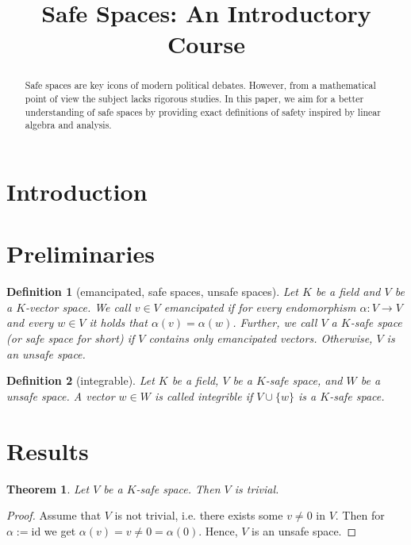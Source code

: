 \documentclass[]{article}
\newtheorem{theorem}{Theorem}
\newtheorem{definition}{Definition}
\begin{document}
\title{Safe Spaces: An Introductory Course}

\maketitle 

\begin{abstract}
Safe spaces are key icons of modern political debates. However, from a mathematical point of view the subject lacks rigorous studies. In this paper, we aim for a better understanding of safe spaces by providing exact definitions of safety inspired by linear algebra and analysis. 
\end{abstract}

\section{Introduction}



\section{Preliminaries}

\begin{definition}[emancipated, safe spaces, unsafe spaces]
	Let $K$ be a field and $V$ be a $K$-vector space. We call $v \in V$ \emph{emancipated} if for every endomorphism $\alpha: V \to V$ and every $w \in V$ it holds that $\alpha(v) = \alpha(w)$. Further, we call $V$ a \emph{$K$-safe space} (or \emph{safe space} for short) if $V$ contains only emancipated vectors. Otherwise, $V$ is an \emph{unsafe space}.
\end{definition}


\begin{definition}[integrable]
	Let $K$ be a field, $V$ be a $K$-safe space, and $W$ be a unsafe space.
	A vector $w \in W$ is called \emph{integrible} if $V \cup \{w\}$ is a $K$-safe space.
\end{definition}

\section{Results}

\begin{theorem}\label{thm:safe-space-trivial}
	Let $V$ be a $K$-safe space. Then $V$ is trivial.
\end{theorem}
\begin{proof}
	Assume that $V$ is not trivial, i.e. there exists some $v \neq 0$ in $V$. Then for $\alpha := \text{id}$ we get $\alpha(v) = v \neq 0 = \alpha(0)$. Hence, $V$ is an unsafe space.
\end{proof}
\end{document}
